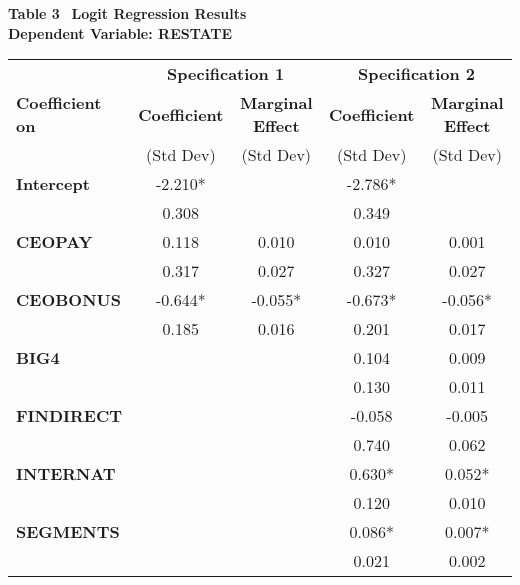 \documentclass[14pt]{article}
\newcommand\T{\rule[0em]{0pt}{1.5em}}       %
\begin{document}
\begin{table}[t]
\begin{center}
{\bf Table 3} \
{\bf Logit Regression Results} \\
{\bf Dependent Variable:  RESTATE} \\[1em]
\begin{tabular}{|l|cc|cc|}
\hline
             & \multicolumn{2}{c|}{\bf Specification 1}  &  \multicolumn{2}{c|}{\bf Specification 2}   \\
 {\bf Coefficient on}  &  {\bf Coefficient} & {\bf Marginal Effect} & {\bf Coefficient} & {\bf Marginal Effect}  \\ 
          &  (Std Dev)  & (Std Dev) &  (Std Dev)  & (Std Dev) \\ \hline
\T {\bf Intercept} &   -2.210*   &   & -2.786*   &    \\
                   &   0.308   &   & 0.349   &   \\[.6em]
 {\bf CEOPAY}    &   0.118    &  0.010  & 0.010    &  0.001   \\
                   &   0.317   &  0.027 & 0.327   &  0.027 \\[.6em]
 {\bf CEOBONUS}  &   -0.644*   &  -0.055* & -0.673*   &  -0.056*  \\
                   &   0.185   &  0.016 & 0.201   &  0.017 \\[.6em]
 {\bf BIG4 }  &       &    & 0.104    &  0.009   \\
                   &      &   & 0.130   &  0.011 \\[.6em]
 {\bf FINDIRECT}  &       &    & -0.058    &  -0.005   \\
                   &      &   & 0.740   &  0.062 \\[.6em]
 {\bf INTERNAT }  &       &    & 0.630*   &  0.052*  \\
                   &      &   & 0.120   &  0.010 \\[.6em]
 {\bf SEGMENTS}  &       &    & 0.086*   &  0.007*  \\
                   &      &   & 0.021   &  0.002 \\[.6em]
\hline
\end{tabular}
\end{center}
\end{table}
\end{document}
